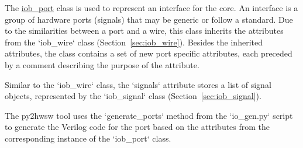 %

%
%

The \href{https://github.com/IObundle/py2hwsw/blob/main/py2hwsw/scripts/iob_port.py}{iob\_port} class is used to represent an interface for the core.
An interface is a group of hardware ports (signals) that may be generic or follow a standard.
Due to the similarities between a port and a wire, this class inherits the attributes from the `iob\_wire` class (Section~\ref{sec:iob_wire}).
Besides the inherited attributes, the class contains a set of new port specific attributes, each preceded by a comment describing the purpose of the attribute.


Similar to the `iob\_wire` class, the `signals` attribute stores a list of signal objects, represented by the `iob\_signal` class  (Section~\ref{sec:iob_signal}).

%
%

The py2hwsw tool uses the `generate\_ports` method from the `io\_gen.py` script to generate the Verilog code for the port based on the attributes from the corresponding instance of the `iob\_port` class.


